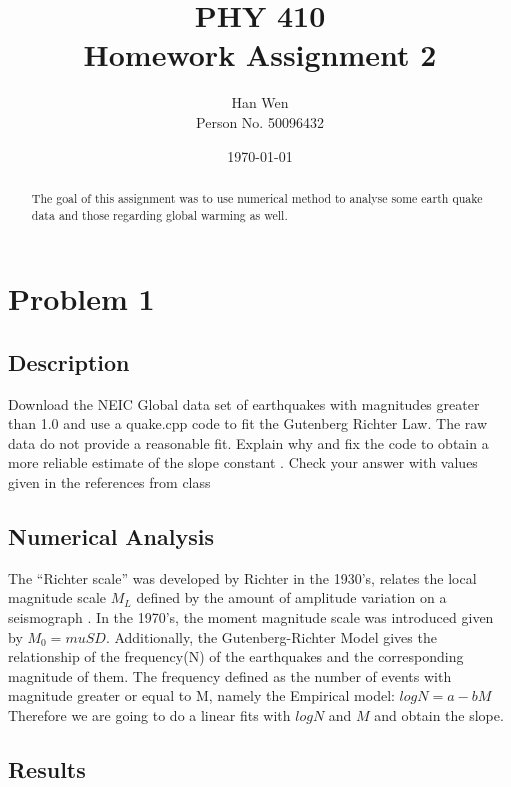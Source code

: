 \documentclass[11pt,letterpaper]{article}
\begin{document}
\title{PHY 410 \\ Homework Assignment 2}
\author{Han Wen \\ \tiny Person No. 50096432}
\date{\today}

\maketitle

\begin{abstract}
The goal of this assignment was to use numerical method to analyse some earth quake data and those regarding global warming as well.
\end{abstract}

\tableofcontents

\newpage
\section{Problem 1}

\subsection{Description}
Download the NEIC Global data set of earthquakes with magnitudes greater than 1.0 and use a quake.cpp code to fit the Gutenberg Richter Law. The raw data do not provide a reasonable fit. Explain why and fix the code to obtain a more reliable estimate of the slope constant  . Check your answer with values given in the references from class\cite{The Physics of Earthquakes}




\subsection{Numerical Analysis}
The “Richter scale” was developed by Richter in the 1930’s, relates the local magnitude scale $M_L$ defined by the amount of amplitude variation on a seismograph \cite{Seismographs and Seismograms}. In the 1970's, the moment magnitude scale was introduced given by $M_0=muSD$. Additionally, the Gutenberg-Richter Model gives the relationship of the frequency(N) of the earthquakes and the corresponding magnitude of them. The frequency defined as the number of events with magnitude greater or equal to M, namely the Empirical model:
$logN=a-bM$
Therefore we are going to do a linear fits with $logN$ and $M$ and obtain the slope.

\subsection{Results}
\end{document}
